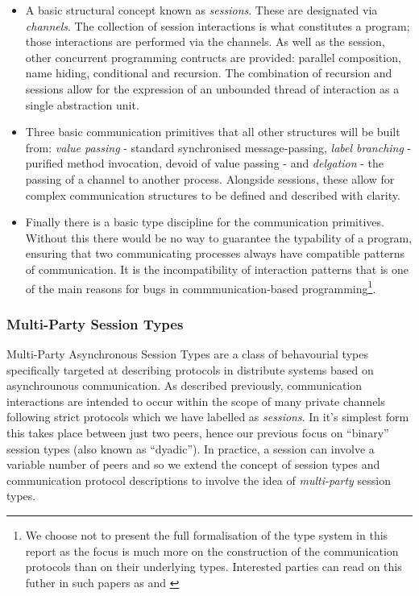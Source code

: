 \documentclass[11pt, abstracton, twoside]{scrartcl}
\begin{document}
\begin{itemize}
	\item A basic structural concept known as \emph{sessions}. These are designated 
	via \emph{channels}. The collection of session interactions is what constitutes a 
	program; those interactions are performed via the channels. As well as the 
	session, other concurrent programming contructs are provided: parallel 
	composition, name hiding, conditional and recursion. The combination of 
	recursion and sessions allow for the expression of an unbounded thread of 
	interaction as a single abstraction unit.

	\item Three basic communication primitives that all other structures will be 
	built from: \emph{value passing} - standard synchronised message-passing, 
	\emph{label branching} - purified method invocation, devoid of value passing - and 
	\emph{delgation} - the passing of a channel to another process. Alongside 
	sessions, these allow for complex communication structures to be defined and 
	described with clarity.

	\item Finally there is a basic type discipline for the communication primitives. 
	Without this there would be no way to guarantee the typability of a program, 
	ensuring that two communicating processes always have compatible patterns of 
	communication. It is the incompatibility of interaction patterns that is one 
	of the main reasons for bugs in commmunication-based programming\footnote{We choose not to present the full formalisation of the type system 
	in this report as the focus is much more on the construction of the 
	communication protocols than on their underlying types. Interested parties can 
	read on this futher in such papers as \cite{HVM98} and \cite{HYC08}}.
\end{itemize}

\subsubsection{Multi-Party Session Types}
Multi-Party Asynchronous Session Types are a class of behavourial types
specifically targeted at describing protocols in distribute systems
based on asynchrounous communication\cite{CCPY15}. As described previously,
communication interactions are intended to occur within the scope of many
private channels following strict protocols which we have labelled as
\emph{sessions}. In it's simplest form this takes place between just two
peers, hence our previous focus on ``binary'' session types (also known as
``dyadic''). In practice, a session can involve a variable number of peers
and so we extend the concept of session types and communication protocol
descriptions to involve the idea of \emph{multi-party} session types.
\end{document}
